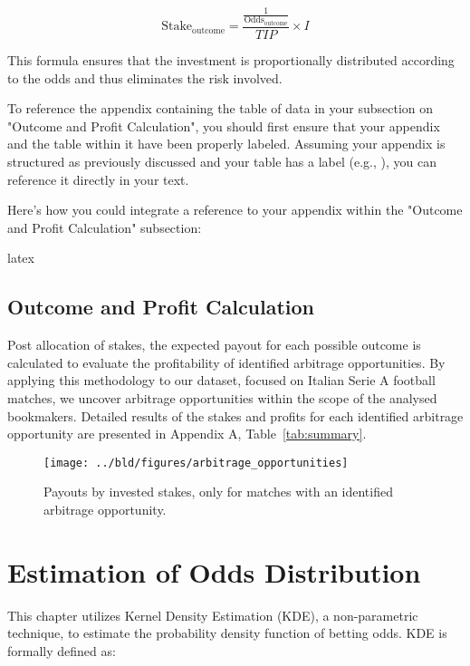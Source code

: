 \documentclass[11pt, a4paper, leqno]{article}
\begin{document}
\begin{equation}
    \text{Stake}_{\text{outcome}} = \frac{\frac{1}{\text{Odds}_{\text{outcome}}}}{TIP} \times I
\end{equation}

This formula ensures that the investment is proportionally distributed according to the odds and thus eliminates the risk involved.

To reference the appendix containing the table of data in your subsection on "Outcome and Profit Calculation", you should first ensure that your appendix and the table within it have been properly labeled. Assuming your appendix is structured as previously discussed and your table has a label (e.g., \label{tab:python-summary}), you can reference it directly in your text.

Here's how you could integrate a reference to your appendix within the "Outcome and Profit Calculation" subsection:

latex

\subsection{Outcome and Profit Calculation}
Post allocation of stakes, the expected payout for each possible outcome is calculated to evaluate the profitability of identified arbitrage opportunities. By applying this methodology to our dataset, focused on Italian Serie A football matches, we uncover arbitrage opportunities within the scope of the analysed bookmakers. Detailed results of the stakes and profits for each identified arbitrage opportunity are presented in Appendix A, Table~\ref{tab:summary}.

\begin{figure}[H]

    \centering
    \texttt{[image: ../bld/figures/arbitrage\_opportunities]}
    \caption{Payouts by invested stakes, only for matches with an identified arbitrage opportunity.}
    \label{fig:python-predictions}

\end{figure}

\section{Estimation of Odds Distribution}
\label{subsec:estimation_of_odds_distribution}

This chapter utilizes Kernel Density Estimation (KDE), a non-parametric technique, to estimate the probability density function of betting odds. KDE is formally defined as:
\end{document}
